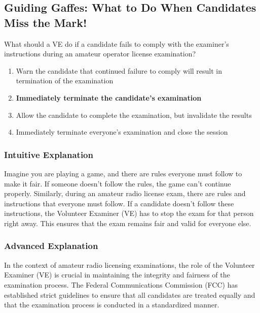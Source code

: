 \subsection{Guiding Gaffes: What to Do When Candidates Miss the Mark!}

\begin{tcolorbox}[colback=gray!10!white,colframe=black!75!black,title=E1E07] What should a VE do if a candidate fails to comply with the examiner’s instructions during an amateur operator license examination?
    \begin{enumerate}[label=\Alph*),noitemsep]
        \item Warn the candidate that continued failure to comply will result in termination of the examination
        \item \textbf{Immediately terminate the candidate’s examination}
        \item Allow the candidate to complete the examination, but invalidate the results
        \item Immediately terminate everyone’s examination and close the session
    \end{enumerate}
\end{tcolorbox}

\subsubsection{Intuitive Explanation}
Imagine you are playing a game, and there are rules everyone must follow to make it fair. If someone doesn’t follow the rules, the game can’t continue properly. Similarly, during an amateur radio license exam, there are rules and instructions that everyone must follow. If a candidate doesn’t follow these instructions, the Volunteer Examiner (VE) has to stop the exam for that person right away. This ensures that the exam remains fair and valid for everyone else.

\subsubsection{Advanced Explanation}
In the context of amateur radio licensing examinations, the role of the Volunteer Examiner (VE) is crucial in maintaining the integrity and fairness of the examination process. The Federal Communications Commission (FCC) has established strict guidelines to ensure that all candidates are treated equally and that the examination process is conducted in a standardized manner.

